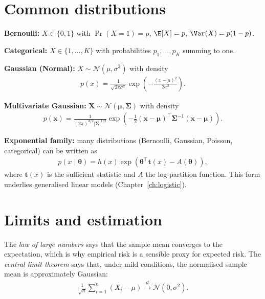 \documentclass[a4paper, 12pt]{book}
\begin{document}
\section{Common distributions}

\textbf{Bernoulli:} $X \in \{0,1\}$ with $\Pr(X=1) = p$, $\E[X]=p$,
$\Var(X)=p(1-p)$.

\textbf{Categorical:} $X \in \{1,\ldots,K\}$ with probabilities
$p_1,\ldots,p_K$ summing to one.

\textbf{Gaussian (Normal):} $X \sim \mathcal{N}(\mu, \sigma^2)$ with density
\begin{align}
    p(x) = \frac{1}{\sqrt{2\pi\sigma^2}}
    \exp\!\left(-\frac{(x-\mu)^2}{2\sigma^2}\right).
\end{align}

\textbf{Multivariate Gaussian:} $\mathbf{X} \sim \mathcal{N}(\boldsymbol{\mu},
\boldsymbol{\Sigma})$ with density
\begin{align}
    p(\mathbf{x}) = \frac{1}{(2\pi)^{d/2}|\boldsymbol{\Sigma}|^{1/2}}
    \exp\!\left(-\frac{1}{2}(\mathbf{x}-\boldsymbol{\mu})^\top
    \boldsymbol{\Sigma}^{-1}(\mathbf{x}-\boldsymbol{\mu})\right).
\end{align}

\textbf{Exponential family:} many distributions (Bernoulli, Gaussian, Poisson,
categorical) can be written as
\begin{align}
    p(x\mid\boldsymbol{\theta}) = h(x)\exp\!\left(\boldsymbol{\theta}^\top
    \mathbf{t}(x) - A(\boldsymbol{\theta})\right),
\end{align}
where $\mathbf{t}(x)$ is the sufficient statistic and $A$ the log-partition function.
This form underlies generalised linear models (Chapter~\ref{ch:logistic}).

\section{Limits and estimation}

The \emph{law of large numbers} says that the sample mean converges to the expectation,
which is why empirical risk is a sensible proxy for expected risk. The
\emph{central limit theorem} says that, under mild conditions, the normalised sample
mean is approximately Gaussian:
\begin{align}
    \frac{1}{\sqrt{n}}\sum_{i=1}^n (X_i - \mu)
    \xrightarrow{d} \mathcal{N}(0,\sigma^2).
\end{align}
\end{document}
